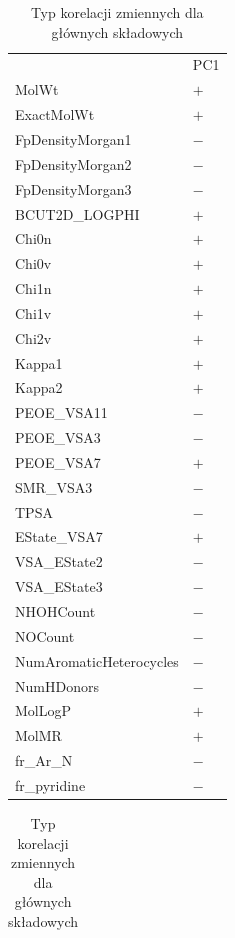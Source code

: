 \documentclass[12pt, a4paper]{article}
\begin{document}
        \begin{table}[ht!]
            \caption{Typ korelacji zmiennych dla głównych składowych}
            \begin{tabular}[t]{ll}
                & PC1 \\
                MolWt & $+$ \\
                ExactMolWt & $+$ \\
                FpDensityMorgan1 & $-$ \\
                FpDensityMorgan2 & $-$ \\
                FpDensityMorgan3 & $-$ \\
                BCUT2D\_LOGPHI & $+$ \\
                Chi0n & $+$ \\
                Chi0v & $+$ \\
                Chi1n & $+$ \\
                Chi1v & $+$ \\
                Chi2v & $+$ \\
                Kappa1 & $+$ \\
                Kappa2 & $+$ \\
                PEOE\_VSA11 & $-$ \\
                PEOE\_VSA3 & $-$ \\
                PEOE\_VSA7 & $+$ \\
                SMR\_VSA3 & $-$ \\
                TPSA & $-$ \\
                EState\_VSA7 & $+$ \\
                VSA\_EState2 & $-$ \\
                VSA\_EState3 & $-$ \\
                NHOHCount & $-$ \\
                NOCount & $-$ \\
                NumAromaticHeterocycles & $-$ \\
                NumHDonors & $-$ \\
                MolLogP & $+$ \\
                MolMR & $+$ \\
                fr\_Ar\_N & $-$ \\
                fr\_pyridine & $-$ \\
            \end{tabular}
            \quad
            \begin{tabular}[t]{ll}

\end{tabular}
\end{table}
\end{document}
